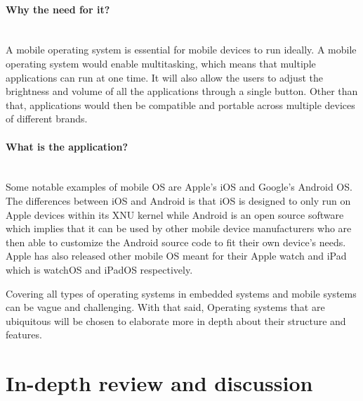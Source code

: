 \documentclass[conference]{IEEEtran}
\newcommand{\forceindent}{\leavevmode{\parindent=1em\indent}}
\begin{document}
\paragraph{Why the need for it?}\mbox{} \\
\forceindent A mobile operating system is essential for mobile devices to run ideally. A mobile operating system would enable multitasking, which means that multiple applications can run at one time. It will also allow the users to adjust the brightness and volume of all the applications through a single button. Other than that, applications would then be compatible and portable across multiple devices of different brands.
\\
\paragraph{What is the application?}\mbox{} \\
\forceindent Some notable examples of mobile OS are Apple’s iOS and Google’s Android OS. The differences between iOS and Android is that iOS is designed to only run on Apple devices within its XNU kernel while Android is an open source software which implies that it can be used by other mobile device manufacturers who are then able to customize the Android source code to fit their own device’s needs. Apple has also released other mobile OS meant for their Apple watch and iPad which is watchOS and iPadOS respectively\cite{CSMOS}.


\forceindent Covering all types of operating systems in embedded systems and mobile systems can be vague and challenging. With that said, Operating  systems  that are ubiquitous will be chosen to elaborate more in depth about their structure and features.



\section{In-depth review and discussion}


\end{document}
